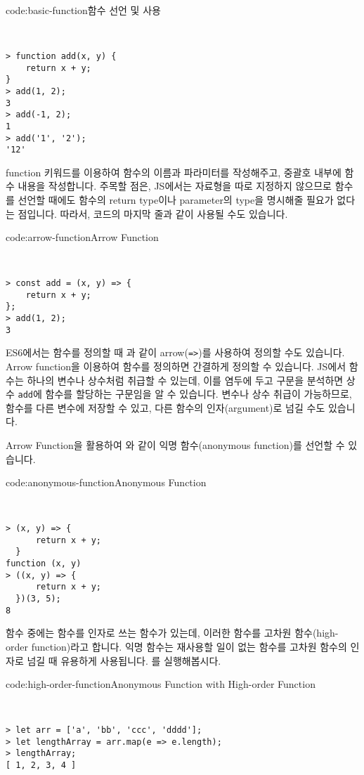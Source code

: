 \begin{codeenv}{code:basic-function}{함수 선언 및 사용}\begin{verbatim}


> function add(x, y) {
    return x + y;
}
> add(1, 2);
3
> add(-1, 2);
1
> add('1', '2');
'12'
\end{verbatim}
\end{codeenv}

function 키워드를 이용하여 함수의 이름과 파라미터를 작성해주고, 중괄호 내부에 함수 내용을 작성합니다. 주목할 점은, JS에서는 자료형을 따로 지정하지 않으므로 함수를 선언할 때에도 함수의 return type이나 parameter의 type을 명시해줄 필요가 없다는 점입니다. 따라서, 코드의 마지막 줄과 같이 사용될 수도 있습니다. 

\begin{codeenv}{code:arrow-function}{Arrow Function}\begin{verbatim}


> const add = (x, y) => {
    return x + y;
};
> add(1, 2);
3
\end{verbatim}
\end{codeenv}

ES6에서는 함수를 정의할 때 과 같이 arrow(\texttt{=>})를 사용하여 정의할 수도 있습니다. Arrow function을 이용하여 함수를 정의하면 간결하게 정의할 수 있습니다. JS에서 함수는 하나의 변수나 상수처럼 취급할 수 있는데, 이를 염두에 두고 구문을 분석하면 상수 \texttt{add}에 함수를 할당하는 구문임을 알 수 있습니다. 변수나 상수 취급이 가능하므로, 함수를 다른 변수에 저장할 수 있고, 다른 함수의 인자(argument)로 넘길 수도 있습니다. 

Arrow Function을 활용하여 와 같이 익명 함수(anonymous function)를 선언할 수 있습니다. 

\begin{codeenv}{code:anonymous-function}{Anonymous Function}\begin{verbatim}


> (x, y) => {
      return x + y;
  }
function (x, y)
> ((x, y) => {
      return x + y;
  })(3, 5);
8
\end{verbatim}
\end{codeenv}

함수 중에는 함수를 인자로 쓰는 함수가 있는데, 이러한 함수를 고차원 함수(high-order function)라고 합니다. 익명 함수는 재사용할 일이 없는 함수를 고차원 함수의 인자로 넘길 때 유용하게 사용됩니다. 를 실행해봅시다. 

\begin{codeenv}{code:high-order-function}{Anonymous Function with High-order Function}\begin{verbatim}


> let arr = ['a', 'bb', 'ccc', 'dddd'];
> let lengthArray = arr.map(e => e.length);
> lengthArray;
[ 1, 2, 3, 4 ]
\end{verbatim}
\end{codeenv}

